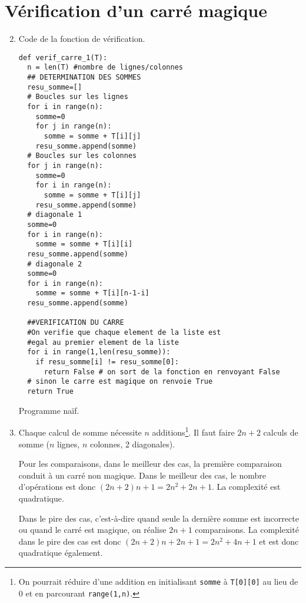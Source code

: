 \section{Vérification d'un carré magique}

\begin{enumerate}
\setcounter{enumi}{1}
\item Code de la fonction de vérification.

\begin{listing}[!h]
\begin{verbatim}
def verif_carre_1(T):
  n = len(T) #nombre de lignes/colonnes
  ## DETERMINATION DES SOMMES
  resu_somme=[]
  # Boucles sur les lignes
  for i in range(n):
    somme=0
    for j in range(n):
      somme = somme + T[i][j]
    resu_somme.append(somme)
  # Boucles sur les colonnes
  for j in range(n):
    somme=0
    for i in range(n):
      somme = somme + T[i][j]
    resu_somme.append(somme)
  # diagonale 1
  somme=0
  for i in range(n):
    somme = somme + T[i][i]
  resu_somme.append(somme)
  # diagonale 2
  somme=0
  for i in range(n):
    somme = somme + T[i][n-1-i]
  resu_somme.append(somme)

  ##VERIFICATION DU CARRE
  #On verifie que chaque element de la liste est
  #egal au premier element de la liste
  for i in range(1,len(resu_somme)):
    if resu_somme[i] != resu_somme[0]:
      return False # on sort de la fonction en renvoyant False
  # sinon le carre est magique on renvoie True
  return True
\end{verbatim}
\caption{Programme naïf.}
\label{prog:factorielle}
\end{listing}

\item Chaque calcul de somme nécessite $n$ additions\footnote{On pourrait réduire d'une addition en initialisant \texttt{somme} à \texttt{T[0][0]} au lieu de 0 et en parcourant \texttt{range(1,n)}.}. Il faut faire $2n+2$ calculs de somme ($n$ lignes, $n$ colonnes, 2 diagonales). 

Pour les comparaisons, dans le meilleur des cas, la première comparaison conduit à un carré non magique. 
Dans le meilleur des cas, le nombre d'opérations est donc $(2n+2)n+1=2n^2 + 2n + 1$. La complexité est quadratique.

Dans le pire des cas, c'est-à-dire quand seule la dernière somme est incorrecte ou quand le carré est magique, on réalise $2n+1$ comparaisons. La complexité dans le pire des cas est donc $(2n+2)n+2n+1=2n^2+4n+1$ et est donc quadratique également.


\end{enumerate}
